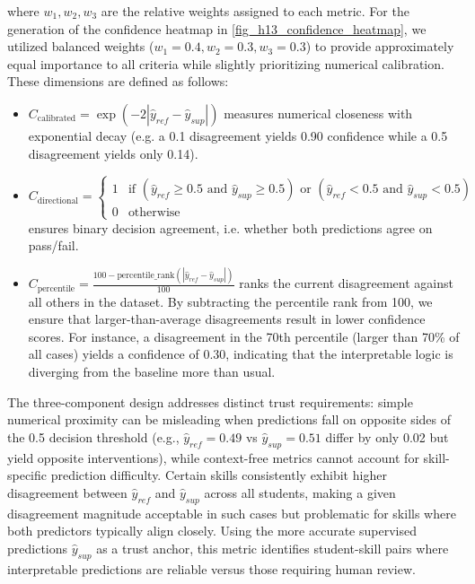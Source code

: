 \documentclass[applsci,article,submit,moreauthors,pdftex]{Definitions/mdpi}
\begin{document}
where $w_1, w_2, w_3$ are the relative weights assigned to each metric. For the generation of the confidence heatmap in \cref{fig_h13_confidence_heatmap}, we utilized balanced weights ($w_1 = 0.4, w_2 = 0.3, w_3 = 0.3$) to provide approximately equal importance to all criteria while slightly prioritizing numerical calibration. These dimensions are defined as follows:

\begin{itemize}
    \item $C_{\text{calibrated}} = \exp(-2|\hat{y}_{ref} - \hat{y}_{sup}|)$ measures numerical closeness with exponential decay (e.g. a 0.1 disagreement yields 0.90 confidence while a 0.5 disagreement yields only 0.14).
    
    \item $C_{\text{directional}} = \begin{cases} 
    1 & \text{if } (\hat{y}_{ref} \geq 0.5 \text{ and } \hat{y}_{sup} \geq 0.5) \text{ or } (\hat{y}_{ref} < 0.5 \text{ and } \hat{y}_{sup} < 0.5) \\
    0 & \text{otherwise}
    \end{cases}$ ensures binary decision agreement, i.e. whether both predictions agree on pass/fail.
    
    \item $C_{\text{percentile}} = \frac{100 - \text{percentile\_rank}(|\hat{y}_{ref} - \hat{y}_{sup}|)}{100}$ ranks the current disagreement against all others in the dataset. By subtracting the percentile rank from 100, we ensure that larger-than-average disagreements result in lower confidence scores. For instance, a disagreement in the 70th percentile (larger than 70\% of all cases) yields a confidence of 0.30, indicating that the interpretable logic is diverging from the baseline more than usual.
\end{itemize}


The three-component design addresses distinct trust requirements: simple numerical proximity can be misleading when predictions fall on opposite sides of the 0.5 decision threshold (e.g., $\hat{y}_{ref}=0.49$ vs $\hat{y}_{sup}=0.51$ differ by only 0.02 but yield opposite interventions), while context-free metrics cannot account for skill-specific prediction difficulty. Certain skills consistently exhibit higher disagreement between $\hat{y}_{ref}$ and $\hat{y}_{sup}$ across all students, making a given disagreement magnitude acceptable in such cases but problematic for skills where both predictors typically align closely. Using the more accurate supervised predictions $\hat{y}_{sup}$ as a trust anchor, this metric identifies student-skill pairs where interpretable predictions are reliable versus those requiring human review.
\end{document}
